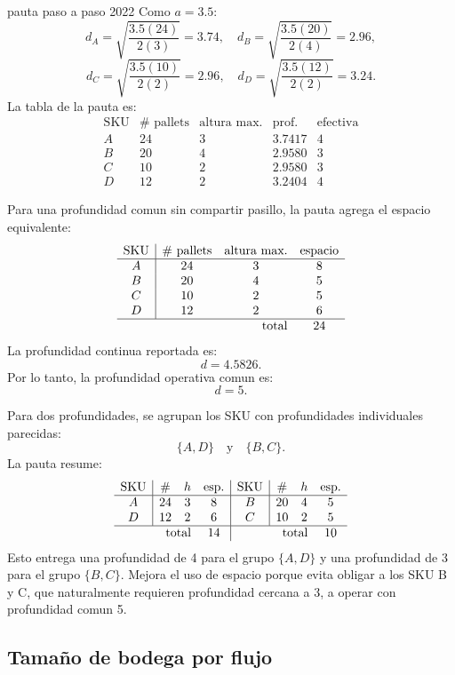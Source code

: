 \begin{pautacompleta}{pauta paso a paso 2022}
Como $a=3.5$:
\[
  d_A=\sqrt{\frac{3.5(24)}{2(3)}}=3.74,\quad
  d_B=\sqrt{\frac{3.5(20)}{2(4)}}=2.96,
\]
\[
  d_C=\sqrt{\frac{3.5(10)}{2(2)}}=2.96,\quad
  d_D=\sqrt{\frac{3.5(12)}{2(2)}}=3.24.
\]
La tabla de la pauta es:
\[
\begin{array}{c|cccc}
\text{SKU} & \#\text{ pallets} & \text{altura max.} & \text{prof.} & \text{efectiva}\\
\hline
A&24&3&3.7417&4\\
B&20&4&2.9580&3\\
C&10&2&2.9580&3\\
D&12&2&3.2404&4
\end{array}
\]

Para una profundidad comun sin compartir pasillo, la pauta agrega el espacio equivalente:
\[
\begin{array}{c|ccc}
\text{SKU} & \#\text{ pallets} & \text{altura max.} & \text{espacio}\\
\hline
A&24&3&8\\
B&20&4&5\\
C&10&2&5\\
D&12&2&6\\
\hline
\multicolumn{3}{r}{\text{total}}&24
\end{array}
\]
La profundidad continua reportada es:
\[
  d=4.5826.
\]
Por lo tanto, la profundidad operativa comun es:
\[
  d=5.
\]

Para dos profundidades, se agrupan los SKU con profundidades individuales parecidas:
\[
  \{A,D\}\quad \text{y}\quad \{B,C\}.
\]
La pauta resume:
\[
\begin{array}{c|ccc|c|ccc}
\text{SKU} & \# & h & \text{esp.} & \text{SKU} & \# & h & \text{esp.}\\
\hline
A&24&3&8 & B&20&4&5\\
D&12&2&6 & C&10&2&5\\
\hline
\multicolumn{3}{r}{\text{total}}&14 & \multicolumn{3}{r}{\text{total}}&10
\end{array}
\]
Esto entrega una profundidad de 4 para el grupo $\{A,D\}$ y una profundidad de 3 para el grupo $\{B,C\}$. Mejora el uso de espacio porque evita obligar a los SKU B y C, que naturalmente requieren profundidad cercana a 3, a operar con profundidad comun 5.
\end{pautacompleta}

\subsection{Tamaño de bodega por flujo}

